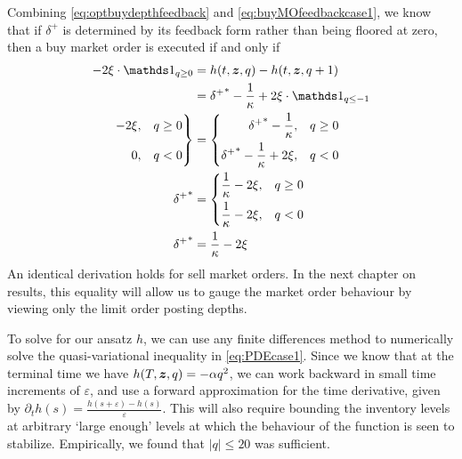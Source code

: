 Combining \eqref{eq:optbuydepthfeedback} and \eqref{eq:buyMOfeedbackcase1}, we know that if $\delta^+$ is determined by its feedback form rather than being floored at zero, then a buy market order is executed if and only if
\begin{align}
-2 \xi \cdot \indicator_{q \geq 0} & = h(t,\bz,q) - h(t, \bz, q+1)  \\
 & = {\delta^+}^* - \frac{1}{\kappa} + 2 \xi \cdot \indicator_{q \leq -1} \\
\left. \begin{aligned} -2 \xi\vphantom{\frac{1}{\kappa}}, \quad & q \geq 0 \\ 0\vphantom{\frac{1}{\kappa}}, \quad & q < 0 \end{aligned} \right\rbrace & = \left\lbrace \begin{aligned} {\delta^+}^* - \frac{1}{\kappa}, \quad & q \geq 0 \\
{\delta^+}^* - \frac{1}{\kappa} + 2 \xi, \quad & q < 0 \end{aligned} \right. \\
  {\delta^+}^* & = \left\lbrace \begin{aligned} \frac{1}{\kappa} -2 \xi, \quad & q \geq 0 \\
\frac{1}{\kappa} - 2 \xi, \quad & q < 0 \end{aligned} \right. \\
 {\delta^+}^* & =  \frac{1}{\kappa} - 2 \xi \label{eq:ctsBuycondition}
\end{align}
An identical derivation holds for sell market orders. In the next chapter on results, this equality will allow us to gauge the market order behaviour by viewing only the limit order posting depths.

To solve for our ansatz $h$, we can use any finite differences method \citep{CS522} to numerically solve the quasi-variational inequality in \eqref{eq:PDEcase1}. Since we know that at the terminal time we have $h(T,\bm{z},q) = -\alpha q^2$, we can work backward in small time increments of $\varepsilon$, and use a forward approximation for the time derivative, given by $\partial_t h (s) = \frac{h(s+\varepsilon) - h(s)}{\varepsilon}$. This will also require bounding the inventory levels at arbitrary `large enough' levels at which the behaviour of the function is seen to stabilize. Empirically, we found that $|q|\leq 20$ was sufficient. 